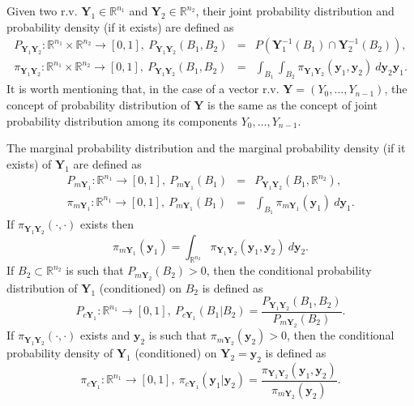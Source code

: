 Given two r.v. $\mathbf{Y}_1\in\mathbb{R}^{n_1}$ and $\mathbf{Y}_2\in\mathbb{R}^{n_2}$,
their joint probability distribution and probability density (if it exists) are defined as
\begin{eqnarray*}
P_{\mathbf{Y}_1\mathbf{Y}_2}:\mathbb{R}^{n_1}\times\mathbb{R}^{n_2}\rightarrow[0,1],~
P_{\mathbf{Y}_1\mathbf{Y}_2}(B_1,B_2)
& = &
P(\mathbf{Y}_1^{-1}(B_1)\cap\mathbf{Y}_2^{-1}(B_2)), \\
\pi_{\mathbf{Y}_1\mathbf{Y}_2}:\mathbb{R}^{n_1}\times\mathbb{R}^{n_2}\rightarrow[0,1],~
P_{\mathbf{Y}_1\mathbf{Y}_2}(B_1,B_2)
& = &
\int_{B_1}\int_{B_2}\pi_{\mathbf{Y}_1\mathbf{Y}_2}(\mathbf{y}_1,\mathbf{y}_2)~d\mathbf{y}_2\mathbf{y}_1.
\end{eqnarray*}
It is worth mentioning that, in the case of a vector r.v. $\mathbf{Y}=(Y_0,\ldots,Y_{n-1})$,
the concept of probability distribution of $\mathbf{Y}$ is the same as
the concept of joint probability distribution among its components $Y_0,\ldots,Y_{n-1}$.
%

The marginal probability distribution and the marginal probability density (if it exists) of $\mathbf{Y}_1$ are defined as
\begin{eqnarray*}
P_{m\mathbf{Y}_1}:\mathbb{R}^{n_1}\rightarrow[0,1],~
P_{m\mathbf{Y}_1}(B_1)
& = &
P_{\mathbf{Y}_1\mathbf{Y}_2}(B_1,\mathbb{R}^{n_2}), \\
\pi_{m\mathbf{Y}_1}:\mathbb{R}^{n_1}\rightarrow[0,1],~
P_{m\mathbf{Y}_1}(B_1)
& = &
\int_{B_1}\pi_{m\mathbf{Y}_1}(\mathbf{y}_1)~d\mathbf{y}_1.
\end{eqnarray*}
%
If $\pi_{\mathbf{Y}_1\mathbf{Y}_2}(\cdot,\cdot)$ exists then
\begin{equation*}
\pi_{m\mathbf{Y}_1}(\mathbf{y}_1)
=
\int_{\mathbb{R}^{n_2}}\pi_{\mathbf{Y}_1\mathbf{Y}_2}(\mathbf{y}_1,\mathbf{y}_2)~d\mathbf{y}_2.
\end{equation*}
%
If $B_2\subset\mathbb{R}^{n_2}$ is such that $P_{m\mathbf{Y}_2}(B_2)>0$, then the
conditional probability distribution of $\mathbf{Y}_1$ (conditioned) on $B_2$ is defined as
\begin{equation*}
P_{c\mathbf{Y}_1}:\mathbb{R}^{n_1}\rightarrow[0,1],~
P_{c\mathbf{Y}_1}(B_1|B_2)
=
\frac
{P_{\mathbf{Y}_1\mathbf{Y}_2}(B_1,B_2)}
{P_{m\mathbf{Y}_2}(B_2)}.
\end{equation*}
%
If $\pi_{\mathbf{Y}_1\mathbf{Y}_2}(\cdot,\cdot)$ exists and $\mathbf{y}_2$ is such that $\pi_{m\mathbf{Y}_2}(\mathbf{y}_2)>0$, then the
conditional probability density of $\mathbf{Y}_1$ (conditioned) on $\mathbf{Y}_2=\mathbf{y}_2$ is defined as
\begin{equation*}
\pi_{c\mathbf{Y}_1}:\mathbb{R}^{n_1}\rightarrow[0,1],~
\pi_{c\mathbf{Y}_1}(\mathbf{y}_1|\mathbf{y}_2)
=
\frac
{\pi_{\mathbf{Y}_1\mathbf{Y}_2}(\mathbf{y}_1,\mathbf{y}_2)}
{\pi_{m\mathbf{Y}_2}(\mathbf{y}_2)}.
\end{equation*}

